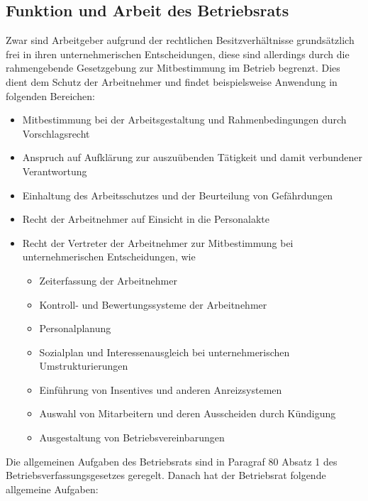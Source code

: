 \subsection{Funktion und Arbeit des Betriebsrats}
Zwar sind Arbeitgeber aufgrund der rechtlichen Besitzverhältnisse grundsätzlich frei in ihren unternehmerischen Entscheidungen, diese sind allerdings durch die rahmengebende Gesetzgebung zur Mitbestimmung im Betrieb begrenzt. Dies dient dem Schutz der Arbeitnehmer und findet beispielsweise Anwendung in folgenden Bereichen: 
\newline
\begin{itemize}
	\item Mitbestimmung bei der Arbeitsgestaltung und Rahmenbedingungen durch Vorschlagsrecht
	\item Anspruch auf Aufklärung zur auszuübenden Tätigkeit und damit verbundener Verantwortung
	\item Einhaltung des Arbeitsschutzes und der Beurteilung von Gefährdungen
	\item Recht der Arbeitnehmer auf Einsicht in die Personalakte
	\item Recht der Vertreter der Arbeitnehmer zur Mitbestimmung bei unternehmerischen Entscheidungen, wie
	\begin{itemize}
		\item Zeiterfassung der Arbeitnehmer
		\item Kontroll- und Bewertungssysteme der Arbeitnehmer
		\item Personalplanung
		\item Sozialplan und Interessenausgleich bei unternehmerischen Umstrukturierungen
		\item Einführung von Insentives und anderen Anreizsystemen
		\item Auswahl von Mitarbeitern und deren Ausscheiden durch Kündigung
		\item Ausgestaltung von Betriebsvereinbarungen
	\end{itemize}
\end{itemize}
Die allgemeinen Aufgaben des Betriebsrats sind in Paragraf 80 Absatz 1 des Betriebsverfassungsgesetzes geregelt. Danach hat der Betriebsrat folgende allgemeine Aufgaben:
